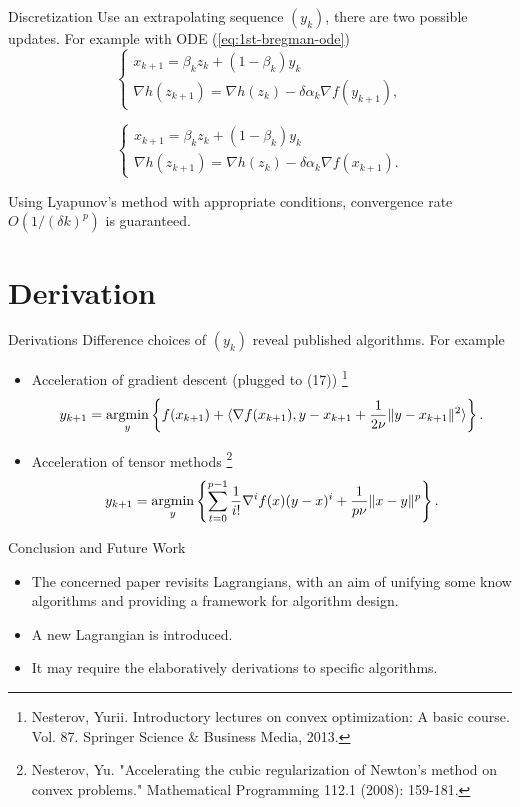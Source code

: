 \begin{frame}{Discretization}
  Use an extrapolating sequence $(y_k)$, there are two possible updates. For example with ODE (\ref{eq:1st-bregman-ode})
  \begin{equation}
    \begin{cases}
      x_{k+1} = \beta_kz_k + (1-\beta_k)y_k \\
      \nabla h(z_{k+1}) = \nabla h(z_{k}) - \delta\alpha_k \nabla f(y_{k+1}),
    \end{cases}
  \end{equation}

  \begin{equation}
    \begin{cases}
      x_{k+1} = \beta_kz_k + (1-\beta_k)y_k \\
      \nabla h(z_{k+1}) = \nabla h(z_{k}) - \delta\alpha_k \nabla f(x_{k+1}).
    \end{cases}
  \end{equation}

  Using Lyapunov's method with appropriate conditions, convergence rate $O(1/(\delta k)^p)$ is guaranteed.
\end{frame}

\section{Derivation}

\begin{frame}{Derivations}
  Difference choices of $(y_k)$ reveal published algorithms. For example
  \begin{itemize}
    \item Acceleration of gradient descent (plugged to (17)) \footnote{Nesterov, Yurii. Introductory lectures on convex optimization: A basic course. Vol. 87. Springer Science \& Business Media, 2013.}
          $$y_{k+1} = \operatorname*{argmin}\limits_{y}\left\{f(x_{k+1}) + \langle \nabla f(x_{k+1}), y - x_{k+1} + \dfrac{1}{2\nu}\|y-x_{k+1}\|^2\rangle\right\}.$$
    \item Acceleration of tensor methods \footnote{Nesterov, Yu. "Accelerating the cubic regularization of Newton’s method on convex problems." Mathematical Programming 112.1 (2008): 159-181.}
          $$y_{k+1} = \operatorname*{argmin}\limits_{y}\left\{\sum\limits_{t=0}^{p-1}\dfrac{1}{i!}\nabla^i f(x)(y-x)^{i} + \dfrac{1}{p\nu}\|x-y\|^p\right\}.$$
  \end{itemize}
\end{frame}

\begin{frame}{Conclusion and Future Work}
  \begin{itemize}
    \item The concerned paper revisits Lagrangians, with an aim of unifying some know algorithms and providing a framework for algorithm design.
    \item A new Lagrangian is introduced.
    \item It may require the elaboratively derivations to specific algorithms.
  \end{itemize}
\end{frame}